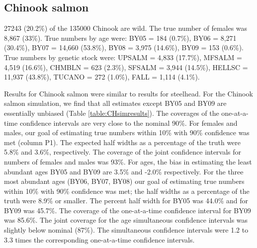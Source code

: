 \documentclass[12pt]{article}
\begin{document}
\subsection{Chinook salmon}

27243 (20.2\%) of the 135000 Chinook are wild. The true number of females was 8,867 (33\%). True numbers by age were: BY05 = 184 (0.7\%), BY06 = 8,271 (30.4\%), BY07 = 14,660 (53.8\%), BY08 = 3,975 (14.6\%), BY09 = 153 (0.6\%). True numbers by genetic stock were: UPSALM = 4,833 (17.7\%), MFSALM = 4,519 (16.6\%), CHMBLN = 623 (2.3\%), SFSALM = 3,944 (14.5\%), HELLSC = 11,937 (43.8\%), TUCANO = 272 (1.0\%), FALL = 1,114 (4.1\%).

Results for Chinook salmon were similar to results for steelhead. For the Chinook salmon simulation, we find that all estimates except BY05 and BY09 are essentially unbiased (Table \ref{table:CHsimresults}). The coverages of the one-at-a-time confidence intervals are very close to the nominal 90\%. For females and males, our goal of estimating true numbers within 10\% with 90\% confidence was met (column P1). The expected half widths as a percentage of the truth were 5.8\% and 3.6\%, respectively. The coverage of the joint confidence intervals for numbers of females and males was 93\%. For ages, the bias in estimating the least abundant ages BY05 and BY09 are 3.5\% and -2.0\% respectively. For the three most abundant ages (BY06, BY07, BY08) our goal of estimating true numbers within 10\% with 90\% confidence was met; the half widths as a percentage of the truth were 8.9\% or smaller. The percent half width for BY05 was 44.0\% and for BY09 was 45.7\%. The coverage of the one-at-a-time confidence interval for BY09 was 85.6\%. The joint coverage for the age simultaneous confidence intervals was slightly below nominal (87\%). The simultaneous confidence intervals were 1.2 to 3.3 times the corresponding one-at-a-time confidence intervals.
\end{document}
